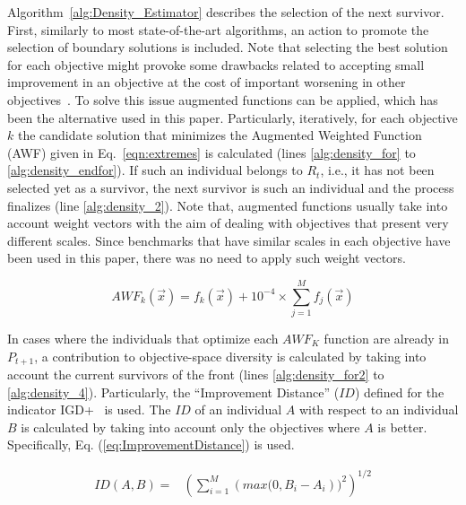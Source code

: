 Algorithm~\ref{alg:Density_Estimator} describes the selection of the next survivor.
%
First, similarly to most state-of-the-art algorithms, an action to promote the selection of boundary solutions
is included.
%
Note that selecting the best solution for each objective might provoke some drawbacks related to accepting small improvement
in an objective at the cost of important worsening in other objectives~\cite{deb2016optimality}.
%
To solve this issue augmented functions can be applied, which has been the alternative used in this paper.
%
Particularly, iteratively, for each objective $k$ the candidate solution that minimizes the Augmented Weighted Function (AWF)
given in Eq.~\ref{eqn:extremes} is calculated (lines \ref{alg:density_for} to \ref{alg:density_endfor}).
%
If such an individual belongs to $R_t$, i.e., it has not been selected yet as a survivor, the next survivor is such an individual
and the process finalizes (line \ref{alg:density_2}).
%
Note that, augmented functions usually take into account weight vectors with the aim of dealing with objectives
that present very different scales.
%
Since benchmarks that have similar scales in each objective have been used in this paper, there was no need to apply
such weight vectors.

\begin{equation}\label{eqn:extremes}
AWF_k (\vec{x}) = f_k(\vec{x}) + 10^{-4} \times  \sum_{j=1}^M f_j( \vec{x} )
\end{equation}


In cases where the individuals that optimize each $AWF_K$ function are already in $P_{t+1}$, a contribution
to objective-space diversity is calculated by taking into account the current survivors of the front (lines \ref{alg:density_for2} to \ref{alg:density_4}).
%
%
Particularly, the ``Improvement Distance'' ($ID$) defined for the indicator IGD+~\cite{Joel:Inverted_Generational_Distance_Plus}
is used.
%
The $ID$ of an individual $A$ with respect to an individual $B$ is calculated by taking into account only the objectives
where $A$ is better.
%
Specifically, Eq. (\ref{eq:ImprovementDistance}) is used.

\begin{equation} \label{eq:ImprovementDistance}
\begin{split}
 ID(A, B) = &  \left (\sum_{i=1}^M \left (max(0, B_i - A_i \right ))^2  \right)^{1/2}
\end{split}
\end{equation}

